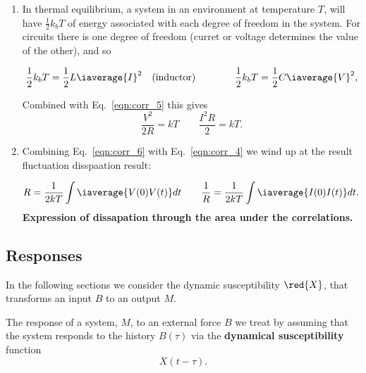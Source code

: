 \begin{enumerate}
 \item  In  thermal   equilibrium,  a  system  in   an  environment  at
   temperature  $  T  $,  will  have  $  \frac{1}{2}k_bT  $  of  energy
   associated with each degree of  freedom in the system.  For circuits
   there is  one degree  of freedom (curret  or voltage  determines the
   value of the other), and so

    \begin{equation}
      \frac{1}{2}k_bT=\frac{1}{2}L\iaverage{I}^2 \quad(\text{inductor})\qquad\qquad \frac{1}{2}k_bT = \frac{1}{2}C\iaverage{V}^2,
    \end{equation}

    \noindent Combined with Eq.~\eqref{eqn:corr_5} this gives
    \begin{equation}\label{eqn:corr_6}
      \frac{V^2}{2R} = kT\qquad \frac{I^2R}{2} = kT.
    \end{equation}

  \item Combining Eq.~\eqref{eqn:corr_6} with Eq.~\eqref{eqn:corr_4} we
    wind up at the result fluctuation disspaation result:
    \begin{framed}\noindent

    \[
      {R}                                                             =
      \frac{1}{2kT}\int\iaverage{V(0)V(t)}dt\qquad\frac{1}{R}=\frac{1}{2kT}\int\iaverage{I(0)I(t)}dt.
    \]
    \textbf{Expression  of  dissapation  through  the  area  under  the
      correlations.}

  \end{framed}
\end{enumerate}

\newpage\subsection{Responses}
\begin{framed}\noindent

  In  the following  sections  we consider  the dynamic  susceptibility
  $ \red{X} $, that transforms an input $ B $ to an output $ M $.

\end{framed}
The response of a system, $ M$, to  an external force $ B $ we treat by
assuming  that the  system responds  to the  history $  B(\tau) $  via the
\textbf{dynamical susceptibility} function
\begin{equation}\label{eqn:response_1}
  X(t-\tau).
\end{equation}

